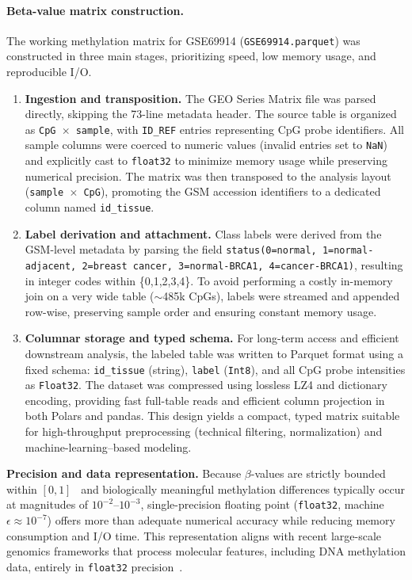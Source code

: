 \documentclass[10pt]{extarticle}
\begin{document}
\paragraph{Beta-value matrix construction.}
The working methylation matrix for GSE69914 (\texttt{GSE69914.parquet}) was constructed in three main stages, prioritizing speed, low memory usage, and reproducible I/O.  
\begin{enumerate}[label=\arabic*)]
  \item \textbf{Ingestion and transposition.}  
  The GEO Series Matrix file was parsed directly, skipping the 73-line metadata header.  
  The source table is organized as \texttt{CpG~$\times$~sample}, with \texttt{ID\_REF} entries representing CpG probe identifiers.  
  All sample columns were coerced to numeric values (invalid entries set to \texttt{NaN}) and explicitly cast to \texttt{float32} to minimize memory usage while preserving numerical precision.  
  The matrix was then transposed to the analysis layout (\texttt{sample~$\times$~CpG}), promoting the GSM accession identifiers to a dedicated column named \texttt{id\_tissue}.
  
  \item \textbf{Label derivation and attachment.}  
  Class labels were derived from the GSM-level metadata by parsing the field \texttt{status(0=normal, 1=normal-adjacent, 2=breast cancer, 3=normal-BRCA1, 4=cancer-BRCA1)}, resulting in integer codes within \{0,1,2,3,4\}.  
  To avoid performing a costly in-memory join on a very wide table ($\sim$485k CpGs), labels were streamed and appended row-wise, preserving sample order and ensuring constant memory usage.

  \item \textbf{Columnar storage and typed schema.}  
  For long-term access and efficient downstream analysis, the labeled table was written to Parquet format using a fixed schema:  
  \texttt{id\_tissue} (string), \texttt{label} (\texttt{Int8}), and all CpG probe intensities as \texttt{Float32}.  
  The dataset was compressed using lossless LZ4 and dictionary encoding, providing fast full-table reads and efficient column projection in both Polars and pandas.  
  This design yields a compact, typed matrix suitable for high-throughput preprocessing (technical filtering, normalization) and machine-learning–based modeling.
\end{enumerate}

\textbf{Precision and data representation.}
Because $\beta$-values are strictly bounded within $[0,1]$~\cite{Teschendorff2013BMIQ} and biologically meaningful methylation differences typically occur at magnitudes of $10^{-2}$–$10^{-3}$, single-precision floating point (\texttt{float32}, machine~$\epsilon \approx 10^{-7}$) offers more than adequate numerical accuracy while reducing memory consumption and I/O time.  
This representation aligns with recent large-scale genomics frameworks that process molecular features, including DNA methylation data, entirely in \texttt{float32} precision~\cite{deAlmeida2025ChatNT}.
\end{document}
